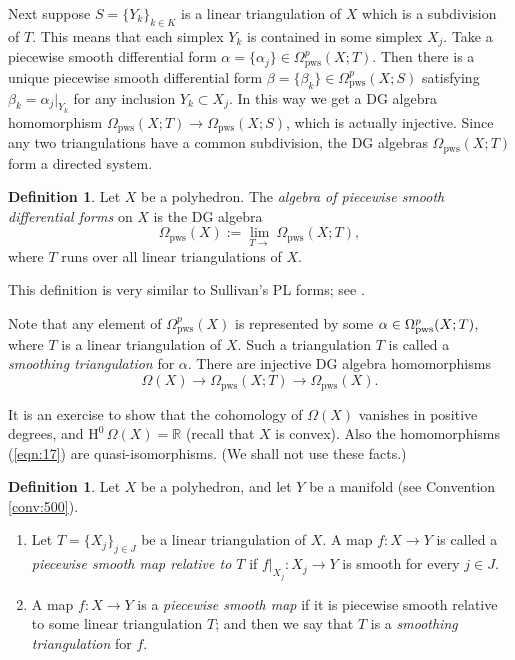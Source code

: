 \documentclass[10pt, a4paper]{amsart}
\theoremstyle{definition}
\newtheorem{dfn}[equation]{Definition}
\numberwithin{equation}{section}
\newcommand{\mrm}[1]{\mathrm{#1}}
\newcommand{\mbb}[1]{\mathbb{#1}}
\newcommand{\R}{\mbb{R}}
\newcommand{\lb}{\linebreak}
\begin{document}
Next suppose $S = \{ Y_k \}_{k \in K}$ is a linear triangulation of 
$X$ which is a subdivision of $T$. This means that each simplex
$Y_k$ is contained in some simplex $X_j$. Take a piecewise smooth differential
form 
$\alpha = \{ \alpha_j \} \in \Omega^p_{\mrm{pws}}(X; T)$.
Then there is a unique piecewise smooth differential form 
$\beta = \{ \beta_k \} \in \Omega^p_{\mrm{pws}}(X; S)$
satisfying 
$\beta_k = \alpha_j|_{Y_k}$
for any inclusion $Y_k \subset X_j$.
In this way we get a DG algebra homomorphism
$\Omega_{\mrm{pws}}(X; T) \to \Omega_{\mrm{pws}}(X; S)$, which is actually
injective. Since any two triangulations have a common subdivision,
the DG algebras $\Omega_{\mrm{pws}}(X; T)$ form a directed system. 

\begin{dfn} \label{dfn:25}
Let $X$ be a polyhedron. The 
{\em algebra of piecewise smooth differential forms} 
on $X$ is the DG algebra
\[ \Omega_{\mrm{pws}}(X) := \lim_{T \to}\, \Omega_{\mrm{pws}}(X; T) , \]
where $T$ runs over all linear triangulations of $X$.
\end{dfn}

This definition is very similar to Sullivan's PL forms; see \cite{FHT}. 

Note that any element of
$\Omega^p_{\mrm{pws}}(X)$ is represented by 
some $\alpha \in \lb \Omega^p_{\mrm{pws}}(X; T)$, where $T$ is a
linear triangulation of $X$.
Such a triangulation $T$ is called a {\em smoothing triangulation} for 
$\alpha$. There are injective DG algebra homomorphisms
\begin{equation} \label{eqn:17}
\Omega(X) \to \Omega_{\mrm{pws}}(X; T) \to \Omega_{\mrm{pws}}(X) .
\end{equation}

It is an exercise to show that the cohomology of 
$\Omega(X)$ vanishes in positive degrees, and 
$\mrm{H}^0 \, \Omega(X) = \R$ (recall that $X$ is convex).
Also the homomorphisms (\ref{eqn:17}) are quasi-isomorphisms. 
(We shall not use these facts.)

\begin{dfn} \label{dfn:504}
Let $X$ be a polyhedron, and let $Y$ be a manifold (see Convention
\ref{conv:500}). 
\begin{enumerate}
\item  Let $T = \{ X_j \}_{j \in J}$ be a linear triangulation of $X$.
A map $f : X \to Y$ is called a {\em piecewise smooth map relative to $T$}
if $f|_{X_j} : X_j \to Y$ is smooth for every $j \in J$. 

\item A map $f : X \to Y$ is a  {\em piecewise smooth map}
if it is piecewise smooth relative to some linear triangulation $T$; and then 
we say that $T$ is a {\em smoothing triangulation} for $f$.
\end{enumerate}
\end{dfn}
\end{document}
